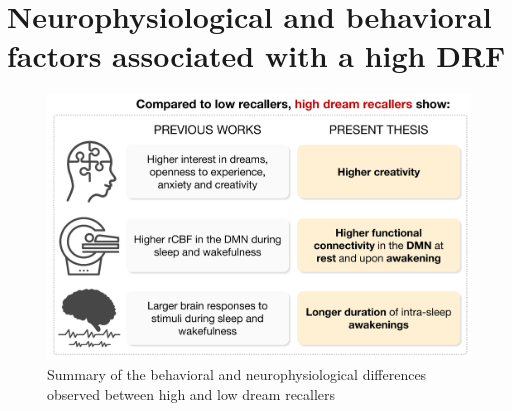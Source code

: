 \cleardoublepage

\chapter{Neurophysiological and behavioral factors associated with a high DRF}
\label{disc:drf}

\begin{figure}[htb]
	\includegraphics[width=\textwidth]{Fig/Discussion/HR_recap.png}
	\caption[Summary of the results on DRF]{Summary of the behavioral and neurophysiological differences observed between high and low dream recallers}
	\label{fig:disc:drf}
\end{figure}
